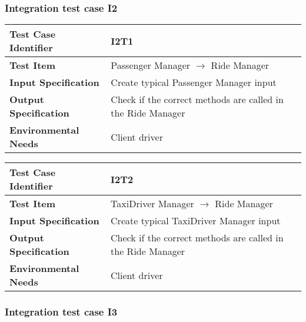 \subsubsection{Integration test case I2}

\begin{table}[!htbp]
\begin{center}
\begin{tabular}[t]{p{}p{}}

\hline
\textbf{Test Case Identifier} & I2T1 \\
\hline
\textbf{Test Item} & Passenger Manager $\rightarrow$ Ride Manager \\
\hline
\textbf{Input Specification} & Create typical Passenger Manager input \\
\hline
\textbf{Output Specification} & Check if the correct methods are called in the Ride Manager \\
\hline
\textbf{Environmental Needs} & Client driver \\
\hline

\end{tabular}
\end{center}
\end{table}

\begin{table}[!htbp]
\begin{center}
\begin{tabular}[t]{p{}p{}}

\hline
\textbf{Test Case Identifier} & I2T2 \\
\hline
\textbf{Test Item} & TaxiDriver Manager $\rightarrow$ Ride Manager \\
\hline
\textbf{Input Specification} & Create typical TaxiDriver Manager input \\
\hline
\textbf{Output Specification} & Check if the correct methods are called in the Ride Manager \\
\hline
\textbf{Environmental Needs} & Client driver \\
\hline

\end{tabular}
\end{center}
\end{table}

\clearpage

\subsubsection{Integration test case I3}

